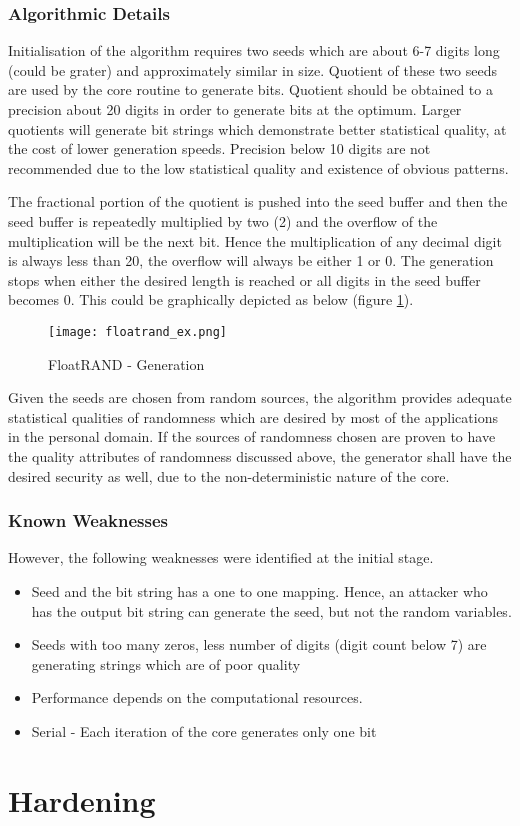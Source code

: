 \subsubsection{Algorithmic Details}

Initialisation of the algorithm requires two seeds which are about 6-7 digits long (could be grater) and approximately similar in size. Quotient of these two seeds are used by the core routine to generate bits. Quotient should be obtained to a precision about 20 digits in order to generate bits at the optimum. Larger quotients will generate bit strings which demonstrate better statistical quality, at the cost of lower generation speeds. Precision below 10 digits are not recommended due to the low statistical quality and existence of obvious patterns.

The fractional portion of the quotient is pushed into the seed buffer and then the seed buffer is repeatedly multiplied by two (2) and the overflow of the multiplication will be the next bit. Hence the multiplication of any decimal digit is always less than 20, the overflow will always be either 1 or 0. The generation stops when either the desired length is reached or all digits in the seed buffer becomes 0. This could be graphically depicted as below (figure \ref{fig:floatrand_ex}).

\begin{figure}[h!]
    \texttt{[image: floatrand\_ex.png]}
    \centering
    \caption{FloatRAND - Generation}
    \label{fig:floatrand_ex}
\end{figure}

Given the seeds are chosen from random sources, the algorithm provides adequate statistical qualities of randomness which are desired by most of the applications in the personal domain. If the sources of randomness chosen are proven to have the quality attributes of randomness discussed above, the generator shall have the desired security as well, due to the non-deterministic nature of the core.

\subsubsection{Known Weaknesses}

However, the following weaknesses were identified at the initial stage.

\begin{itemize}
    \item Seed and the bit string has a one to one mapping. Hence, an attacker who has the output bit string can generate the seed, but not the random variables.

    \item Seeds with too many zeros, less number of digits (digit count below 7) are generating strings which are of poor quality

    \item Performance depends on the computational resources.

    \item Serial - Each iteration of the core generates only one bit
\end{itemize}


\section{Hardening}